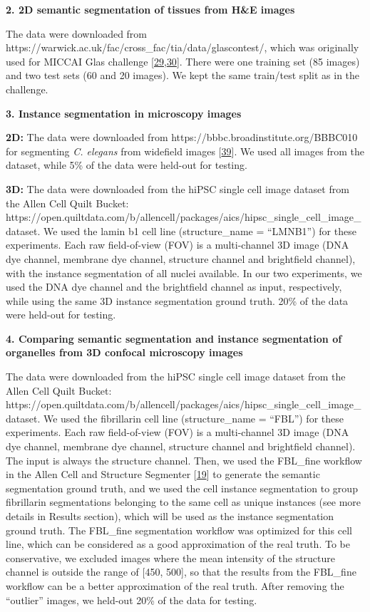 \textbf{2. 2D semantic segmentation of tissues from H\&E images}

The data were downloaded from https://warwick.ac.uk/fac/cross\_fac/tia/data/glascontest/, which was originally used for MICCAI Glas challenge {[}\protect\hyperlink{ref-45Sirz1X}{29},\protect\hyperlink{ref-XAffSYIR}{30}{]}. There were one training set (85 images) and two test sets (60 and 20 images). We kept the same train/test split as in the challenge.

\textbf{3. Instance segmentation in microscopy images}

\textbf{2D:} The data were downloaded from https://bbbc.broadinstitute.org/BBBC010 for segmenting \emph{C. elegans} from widefield images {[}\protect\hyperlink{ref-138foKNOh}{39}{]}. We used all images from the dataset, while 5\% of the data were held-out for testing.

\textbf{3D:} The data were downloaded from the hiPSC single cell image dataset from the Allen Cell Quilt Bucket: https://open.quiltdata.com/b/allencell/packages/aics/hipsc\_single\_cell\_image\_dataset. We used the lamin b1 cell line (structure\_name = ``LMNB1'') for these experiments. Each raw field-of-view (FOV) is a multi-channel 3D image (DNA dye channel, membrane dye channel, structure channel and brightfield channel), with the instance segmentation of all nuclei available. In our two experiments, we used the DNA dye channel and the brightfield channel as input, respectively, while using the same 3D instance segmentation ground truth. 20\% of the data were held-out for testing.

\textbf{4. Comparing semantic segmentation and instance segmentation of organelles from 3D confocal microscopy images}

The data were downloaded from the hiPSC single cell image dataset from the Allen Cell Quilt Bucket: https://open.quiltdata.com/b/allencell/packages/aics/hipsc\_single\_cell\_image\_dataset. We used the fibrillarin cell line (structure\_name = ``FBL'') for these experiments. Each raw field-of-view (FOV) is a multi-channel 3D image (DNA dye channel, membrane dye channel, structure channel and brightfield channel). The input is always the structure channel. Then, we used the FBL\_fine workflow in the Allen Cell and Structure Segmenter {[}\protect\hyperlink{ref-jM3v1UjQ}{19}{]} to generate the semantic segmentation ground truth, and we used the cell instance segmentation to group fibrillarin segmentations belonging to the same cell as unique instances (see more details in Results section), which will be used as the instance segmentation ground truth. The FBL\_fine segmentation workflow was optimized for this cell line, which can be considered as a good approximation of the real truth. To be conservative, we excluded images where the mean intensity of the structure channel is outside the range of {[}450, 500{]}, so that the results from the FBL\_fine workflow can be a better approximation of the real truth. After removing the ``outlier'' images, we held-out 20\% of the data for testing.

